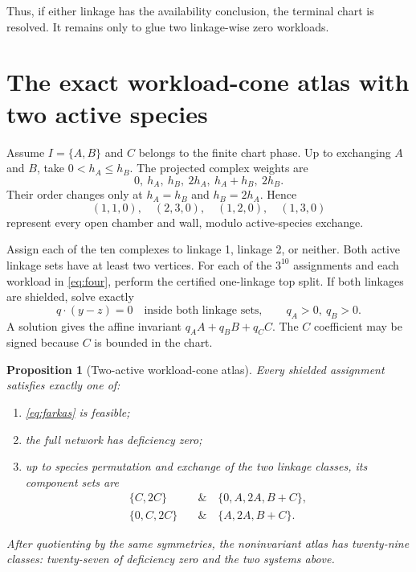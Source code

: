 \documentclass[11pt]{article}
\newtheorem{proposition}[theorem]{Proposition}
\theoremstyle{definition}\newtheorem{definition}[theorem]{Definition}
\theoremstyle{remark}\newtheorem{remark}[theorem]{Remark}
\begin{document}
Thus, if either linkage has the availability conclusion, the terminal chart is resolved.  It remains only to glue two linkage-wise zero workloads.

\section{The exact workload-cone atlas with two active species}

Assume $I=\{A,B\}$ and $C$ belongs to the finite chart phase.  Up to exchanging $A$ and $B$, take $0<h_A\le h_B$.  The projected complex weights are
\[
0,\ h_A,\ h_B,\ 2h_A,\ h_A+h_B,\ 2h_B.
\]
Their order changes only at $h_A=h_B$ and $h_B=2h_A$.  Hence
\begin{equation}\label{eq:four}
 (1,1,0),\quad(2,3,0),\quad(1,2,0),\quad(1,3,0)
\end{equation}
represent every open chamber and wall, modulo active-species exchange.

Assign each of the ten complexes to linkage 1, linkage 2, or neither.  Both active linkage sets have at least two vertices.  For each of the $3^{10}$ assignments and each workload in \eqref{eq:four}, perform the certified one-linkage top split.  If both linkages are shielded, solve exactly
\begin{equation}\label{eq:farkas}
 q\cdot(y-z)=0\quad\text{inside both linkage sets},
 \qquad q_A>0,\ q_B>0.
\end{equation}
A solution gives the affine invariant $q_AA+q_BB+q_CC$.  The $C$ coefficient may be signed because $C$ is bounded in the chart.

\begin{proposition}[Two-active workload-cone atlas]\label{prop:atlas}
Every shielded assignment satisfies exactly one of:
\begin{enumerate}
\item \eqref{eq:farkas} is feasible;
\item the full network has deficiency zero;
\item up to species permutation and exchange of the two linkage classes, its component sets are
\begin{align}
 \{C,2C\}&\quad\&\quad\{0,A,2A,B+C\},\label{eq:S1}\\
 \{0,C,2C\}&\quad\&\quad\{A,2A,B+C\}.\label{eq:S2}
\end{align}
\end{enumerate}
After quotienting by the same symmetries, the noninvariant atlas has twenty-nine classes: twenty-seven of deficiency zero and the two systems above.
\end{proposition}
\end{document}

